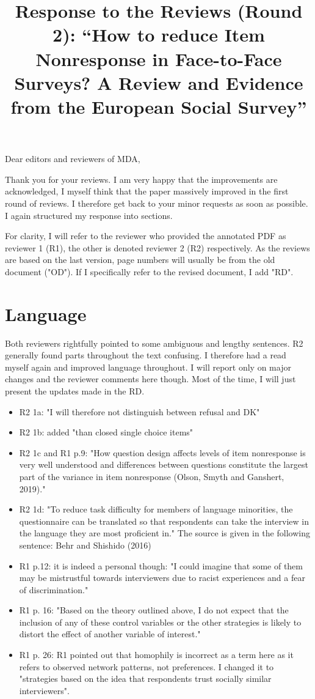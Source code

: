 \documentclass[a4paper, 12pt]{article}
\title{Response to the Reviews (Round 2): “How to reduce Item Nonresponse in Face-to-Face Surveys? A Review and Evidence from the European
Social Survey”}
\begin{document}
\maketitle

Dear editors and reviewers of MDA,

Thank you for your reviews. I am very happy that the improvements are acknowledged, I myself think that the paper massively improved in the first round of reviews. I therefore get back to your minor requests as soon as possible. I again structured my response into sections.

For clarity, I will refer to the reviewer who provided the annotated PDF as reviewer 1 (R1), the other is denoted reviewer 2 (R2) respectively. As the reviews are based on the last version, page numbers will usually be from the old document ("OD"). If I specifically refer to the revised document, I add "RD".

\section{Language}

Both reviewers rightfully pointed to some ambiguous and lengthy sentences. R2 generally found parts throughout the text confusing. I therefore had a read myself again and improved language throughout. I will report only on major changes and the reviewer comments here though. Most of the time, I will just present the updates made in the RD.

\begin{itemize}
\item R2 1a: "I will therefore not distinguish between refusal and DK"
\item R2 1b: added "than closed single choice items"
\item R2 1c and R1 p.9: "How question design affects levels of item nonresponse is very well understood and differences between questions constitute the largest part of the variance in item nonresponse (Olson, Smyth and Ganshert, 2019)."
\item R2 1d: "To reduce task difficulty for members of language minorities, the questionnaire can be translated so that respondents can take the interview in the language they are most proficient in." The source is given in the following sentence: Behr and Shishido (2016)
\item R1 p.12: it is indeed a personal though: "I could imagine that some of them may be mistrustful towards interviewers due to racist experiences and a fear of discrimination."
\item R1 p. 16: "Based on the theory outlined above, I do not expect that the inclusion of any of these control variables or the other strategies is likely to distort the effect of another variable of interest."
\item R1  p. 26: R1 pointed out that homophily is incorrect as a term here as it refers to observed network patterns, not preferences. I changed it to "strategies based on the idea that respondents trust socially similar interviewers".
\end{itemize}
\end{document}
